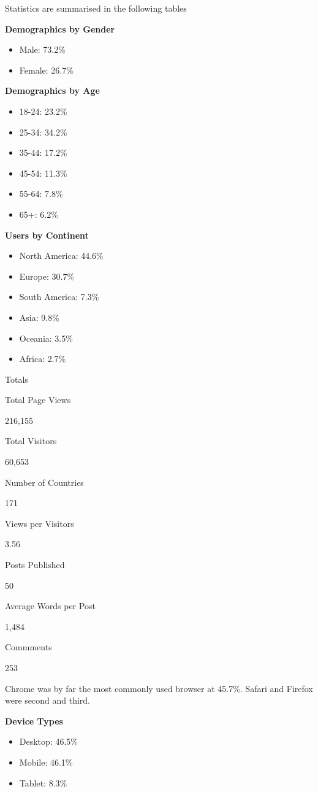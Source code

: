 Statistics are summarised in the following tables

\textbf{Demographics by Gender}
\begin{itemize}
\item Male: 73.2\% 
\item Female: 26.7\% 
\end{itemize}

\textbf{Demographics by Age}
\begin{itemize}
\item 18-24: 23.2\% 
\item 25-34: 34.2\% 
\item 35-44: 17.2\% 
\item 45-54: 11.3\% 
\item 55-64: 7.8\% 
\item 65+: 6.2\% 
\end{itemize}

\textbf{Users by Continent}
\begin{itemize}
\item North America: 44.6\% 
\item Europe: 30.7\% 
\item South America: 7.3\% 
\item Asia: 9.8\% 
\item Oceania: 3.5\% 
\item Africa: 2.7\%
\end{itemize}


Totals

Total Page Views

216,155

Total Visitors

60,653

Number of Countries

171

Views per Visitors

3.56

Posts Published

50

Average Words per Post

1,484

Commments

253

Chrome was by far the most commonly used browser at 45.7\%. Safari and Firefox were second and third.

\textbf{Device Types}
\begin{itemize}
\item Desktop: 46.5\% 
\item Mobile: 46.1\% 
\item Tablet: 8.3\%
\end{itemize}


